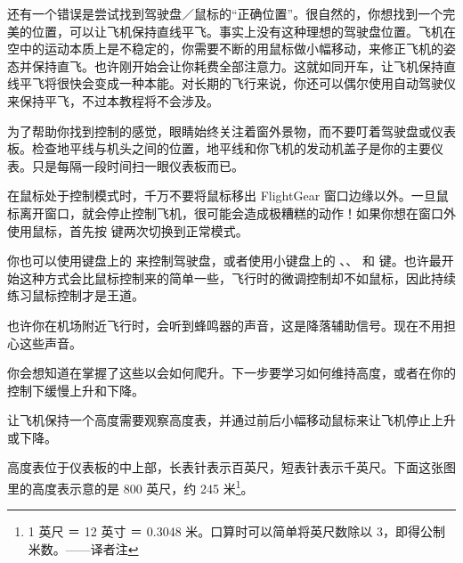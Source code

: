 还有一个错误是尝试找到驾驶盘／鼠标的“正确位置”。很自然的，你想找到一个完美的位置，可以让飞机保持直线平飞。事实上没有这种理想的驾驶盘位置。飞机在空中的运动本质上是不稳定的，你需要不断的用鼠标做小幅移动，来修正飞机的姿态并保持直飞。也许刚开始会让你耗费全部注意力。这就如同开车，让飞机保持直线平飞将很快会变成一种本能。对长期的飞行来说，你还可以偶尔使用自动驾驶仪来保持平飞，不过本教程将不会涉及。

为了帮助你找到控制的感觉，眼睛始终关注着窗外景物，而不要叮着驾驶盘或仪表板。检查地平线与机头之间的位置，地平线和你飞机的发动机盖子是你的主要仪表。只是每隔一段时间扫一眼仪表板而已。

在鼠标处于控制模式时，千万不要将鼠标移出 FlightGear 窗口边缘以外。一旦鼠标离开窗口，就会停止控制飞机，很可能会造成极糟糕的动作！如果你想在窗口外使用鼠标，首先按  键两次切换到正常模式。

你也可以使用键盘上的  来控制驾驶盘，或者使用小键盘上的 、、 和  键。也许最开始这种方式会比鼠标控制来的简单一些，飞行时的微调控制却不如鼠标，因此持续练习鼠标控制才是王道。

也许你在机场附近飞行时，会听到蜂鸣器的声音，这是降落辅助信号。现在不用担心这些声音。

你会想知道在掌握了这些以会如何爬升。下一步要学习如何维持高度，或者在你的控制下缓慢上升和下降。

让飞机保持一个高度需要观察高度表，并通过前后小幅移动鼠标来让飞机停止上升或下降。

高度表位于仪表板的中上部，长表针表示百英尺，短表针表示千英尺。下面这张图里的高度表示意的是 800 英尺，约 245 米\footnote{1 英尺 ＝ 12 英寸 ＝ 0.3048 米。口算时可以简单将英尺数除以 3，即得公制米数。——译者注}。

\medskip

